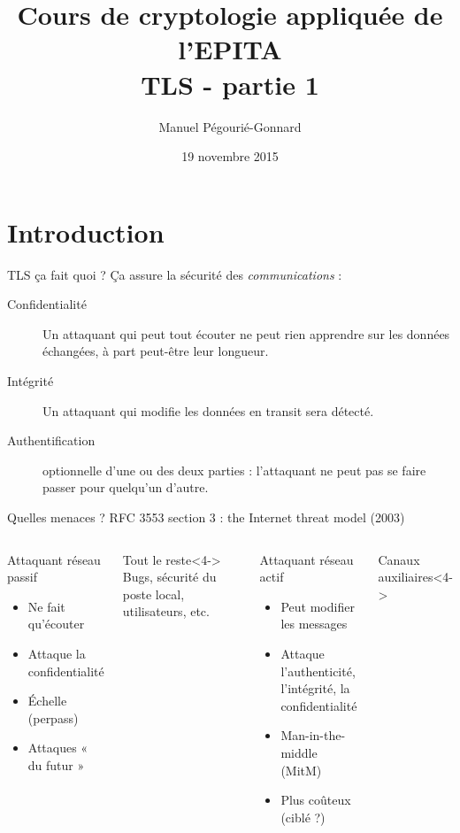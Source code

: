 \documentclass{mpg-ep-slides}
\author[MPG]{Manuel Pégourié-Gonnard}
\institute[ARM]{\normalsize ARM France - IoT - mbed TLS}
\title{Cours de cryptologie appliquée de l'EPITA \\ TLS - partie 1}
\date{19 novembre 2015}
\begin{document}
\maketitle

\section{Introduction}
\tocsect

\begin{frame}{TLS ça fait quoi ?}
  Ça assure la sécurité des \emph{communications} :
  \begin{description}
    \item[Confidentialité] Un attaquant qui peut tout écouter ne peut rien
      apprendre sur les données échangées, à part peut-être leur longueur.
    \item[Intégrité] Un attaquant qui modifie les données en transit sera
      détecté.
    \item[Authentification] optionnelle d'une ou des deux parties :
      l'attaquant ne peut pas se faire passer pour quelqu'un d'autre.
  \end{description}
\end{frame}

\begin{frame}{Quelles menaces ?}
  RFC 3553 section 3 : the Internet threat model (2003)

  \begin{columns}
    \begin{block}{Attaquant réseau passif}
      \begin{itemize}
        \item Ne fait qu'écouter
        \item Attaque la confidentialité
        \item<2-> Échelle (perpass)
        \item<3-> Attaques « du futur »
      \end{itemize}
    \end{block}

    \begin{block}{Tout le reste}<4->
      Bugs, sécurité du poste local, utilisateurs, etc.
    \end{block}

    \begin{block}{Attaquant réseau actif}
      \begin{itemize}
        \item Peut modifier les messages
        \item Attaque l'authenticité, l'intégrité, la confidentialité
        \item Man-in-the-middle (MitM)
        \item<2-> Plus coûteux (ciblé ?)
      \end{itemize}
    \end{block}

    \begin{block}{Canaux auxiliaires}<4->
    \end{block}
  \end{columns}
\end{frame}
\end{document}
